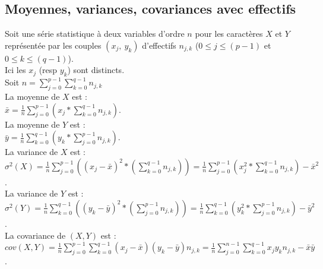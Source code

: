 \documentclass[a4paper,11pt]{book}
\begin{document}
\subsection{Moyennes, variances, covariances avec effectifs}
Soit une s\'erie statistique \`a deux variables d'ordre $n$ 
pour les caract\`eres $X$ et $Y$ repr\'esent\'ee par les couples $(x_j,\ y_k)$ 
d'effectifs $n_{j,k}$
($0 \leq j \leq (p-1)$ et $0 \leq k \leq (q-1)$).\\
Ici les $x_j$ (resp $y_k$) sont distincts.\\
Soit $n=\sum_{j=0}^{p-1}\sum_{k=0}^{q-1}n_{j,k}$\\
La moyenne de $X$ est : \\
$\bar x= \frac{1}{n}\sum_{j=0}^{p-1} (x_j*\sum_{k=0}^{q-1}n_{j,k})$.\\
La moyenne de $Y$ est : \\
$\bar y= \frac{1}{n}\sum_{k=0}^{q-1} (y_k*\sum_{j=0}^{p-1}n_{j,k})$.\\
La variance de $X$ est : \\
$\sigma^2(X)= \frac{1}{n}\sum_{j=0}^{p-1} ((x_j-\bar x)^2 *(\sum_{k=0}^{q-1}n_{j,k}))=\frac{1}{n}\sum_{j=0}^{p-1} (x_j^2*\sum_{k=0}^{q-1}n_{j,k})-\bar x^2$.\\
La variance de $Y$ est : \\
$\sigma^2(Y)= \frac{1}{n}\sum_{k=0}^{q-1} ((y_k-\bar y)^2*( \sum_{j=0}^{p-1}n_{j,k}))=\frac{1}{n}\sum_{k=0}^{q-1} (y_k^2*\sum_{j=0}^{p-1}n_{j,k})-\bar y^2$.\\
La covariance de $(X,Y)$ est : \\
$cov(X,Y)= \frac{1}{n}\sum_{j=0}^{p-1} \sum_{k=0}^{q-1}(x_j-\bar x)(y_k-\bar y)
n_{j,k} =\frac{1}{n}\sum_{j=0}^{n-1} \sum_{k=0}^{q-1}x_jy_kn_{j,k}-\bar x\bar y$.
\end{document}
